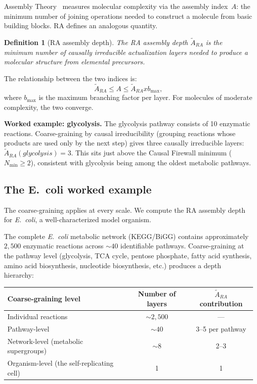 \documentclass[11pt]{article}
\def\mathrm#1{#1}%
\def\text#1{#1}%
\def\times{x}%
\newtheorem{definition}{Definition}
\begin{document}
Assembly Theory~\cite{Sharma2023} measures molecular complexity via the assembly index~$A$: the minimum number of joining operations needed to construct a molecule from basic building blocks. RA defines an analogous quantity.

\begin{definition}[RA assembly depth]
The RA assembly depth $\tilde{A}_{\mathrm{RA}}$ is the minimum number of causally irreducible actualization layers needed to produce a molecular structure from elemental precursors.
\end{definition}

The relationship between the two indices is:
\begin{equation}
\tilde{A}_{\mathrm{RA}} \le A \le \tilde{A}_{\mathrm{RA}} \times b_{\max},
\end{equation}
where $b_{\max}$ is the maximum branching factor per layer. For molecules of moderate complexity, the two converge.

\textbf{Worked example: glycolysis.} The glycolysis pathway consists of 10 enzymatic reactions. Coarse-graining by causal irreducibility (grouping reactions whose products are used only by the next step) gives three causally irreducible layers: $\tilde{A}_{\mathrm{RA}}(\text{glycolysis})=3$. This sits just above the Causal Firewall minimum ($N_{\min}\ge 2$), consistent with glycolysis being among the oldest metabolic pathways.

\subsection{The E.~coli worked example}
\label{sec:ecoli}

The coarse-graining applies at every scale. We compute the RA assembly depth for \emph{E.~coli}, a well-characterized model organism.

The complete \emph{E.~coli} metabolic network (KEGG/BiGG) contains approximately $2{,}500$ enzymatic reactions across $\sim 40$ identifiable pathways. Coarse-graining at the pathway level (glycolysis, TCA cycle, pentose phosphate, fatty acid synthesis, amino acid biosynthesis, nucleotide biosynthesis, etc.) produces a depth hierarchy:

\begin{center}
\begin{tabular}{lcc}
\toprule
Coarse-graining level & Number of layers & $\tilde{A}_{\mathrm{RA}}$ contribution \\
\midrule
Individual reactions & $\sim 2{,}500$ & --- \\
Pathway-level & $\sim 40$ & 3--5 per pathway \\
Network-level (metabolic supergroups) & $\sim 8$ & 2--3 \\
Organism-level (the self-replicating cell) & 1 & 1 \\
\bottomrule
\end{tabular}
\end{center}
\end{document}
